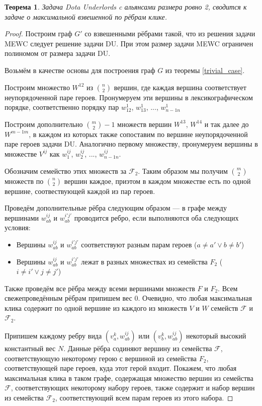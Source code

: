 \documentclass{article}
\newtheorem{theorem}{Теорема}
\begin{document}
\begin{theorem}
    Задача Dota Underlords c альянсами размера ровно 2, сводится к задаче о максимальной взвешенной по рёбрам клике.
\end{theorem}

\begin{proof}
    Построим граф $G'$ со взвешенными рёбрами такой, что из решения задачи MEWC следует решение задачи DU. При этом размер задачи MEWC ограничен полиномом от размера задачи DU.
    
    Возьмём в качестве основы для построения граф $G$ из теоремы \ref{trivial_case}.
    
    Построим множество $W^{12}$ из $\binom{n}{2}$ вершин, где каждая вершина соответствует неупорядоченной паре героев. Пронумеруем эти вершины в лексикографическом порядке, соответственно порядку пар $w_{12}^1$, $w_{13}^1$, ..., $w_{n-1 n}^1$
    
    Построим дополнительно $\binom{m}{2}-1$ множеств вершин $W^{13}$, $W^{14}$ и так далее до $W^{m-1 m}$, в каждом из которых также сопоставим по вершине неупорядоченной паре героев задачи DU. Аналогично первому множеству, пронумеруем вершины в множестве $V^{i j}$ как $w_1^{i j}$, $w_2^{i j}$, ..., $w_{n-1 n}^{i j}$.
    
    Обозначим семейство этих множеств за $\mathcal{F}_2$. Таким образом мы получим $\binom{m}{2}$ множеств по $\binom{n}{2}$ вершин каждое, приэтом в каждом множестве есть по одной вершине, соотвествующей каждой из пар героев.
    
    Проведём дополнительные рёбра следующим образом --- в графе между вершинами $w_{ab}^{i j}$ и $w_{ab}^{i' j'}$ проводится ребро, если выполняются оба следующих условия:
    \begin{itemize}
        \item Вершины $w_{ab}^{i j}$ и $w_{ab}^{i' j'}$ соответствуют разным парам героев ($a \neq a' \lor b \neq b'$)
        \item Вершины $w_{ab}^{i j}$ и $w_{ab}^{i' j'}$ лежат в разных множествах из семейства $F_2$ ($i \neq i' \lor j \neq j'$)
    \end{itemize}
    
    Также проведём все рёбра между всеми вершинами множеств $F$ и $F_2$. Всем свежепроведённым рёбрам припишем вес 0. Очевидно, что любая максимальная клика содержит по одной вершине из каждого из множеств $V$ и $W$ семейств $\mathcal{F}$ и $\mathcal{F}_2$. 
    
    Припишем каждому ребру вида $(v_a^k, w_{ab}^{i j})$ или $(v_b^k, w_{ab}^{i j})$ некоторый высокий константный вес $N$. Данные рёбра содиняют вершину из семейства $\mathcal{F}$, соответствующую некоторому герою с вершиной из семейства $F_2$, соответствующей паре героев, куда этот герой входит. Покажем, что любая максимальная клика в таком графе, содержащая множество вершин из семейства $\mathcal{F}$, соответствующих некоторому набору героев, также содержит и набор вершин из семейства $\mathcal{F}_2$, соответствующий всем парам героев из этого набора.
    

\end{proof}
\end{document}
